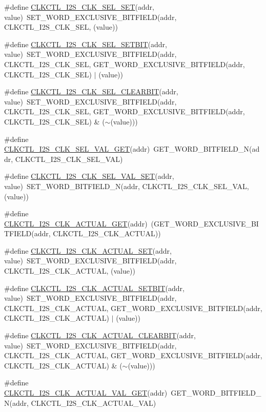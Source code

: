 \begin{DoxyCompactItemize}
\item 
\#define \hyperlink{a00544_af7e823dbf1f0ddaf887c9939338db930}{CLKCTL\_\-I2S\_\-CLK\_\-SEL\_\-SET}(addr, value)~SET\_\-WORD\_\-EXCLUSIVE\_\-BITFIELD(addr, CLKCTL\_\-I2S\_\-CLK\_\-SEL, (value))
\item 
\#define \hyperlink{a00544_a67f9083bc8d6b03da063e4d0124b066d}{CLKCTL\_\-I2S\_\-CLK\_\-SEL\_\-SETBIT}(addr, value)~SET\_\-WORD\_\-EXCLUSIVE\_\-BITFIELD(addr, CLKCTL\_\-I2S\_\-CLK\_\-SEL, GET\_\-WORD\_\-EXCLUSIVE\_\-BITFIELD(addr, CLKCTL\_\-I2S\_\-CLK\_\-SEL) $|$ (value))
\item 
\#define \hyperlink{a00544_a7d988737241ac1ecba2f6bece69cee81}{CLKCTL\_\-I2S\_\-CLK\_\-SEL\_\-CLEARBIT}(addr, value)~SET\_\-WORD\_\-EXCLUSIVE\_\-BITFIELD(addr, CLKCTL\_\-I2S\_\-CLK\_\-SEL, GET\_\-WORD\_\-EXCLUSIVE\_\-BITFIELD(addr, CLKCTL\_\-I2S\_\-CLK\_\-SEL) \& ($\sim$(value)))
\item 
\#define \hyperlink{a00544_ae7a05d4f32df6c568c12038ef168dc6e}{CLKCTL\_\-I2S\_\-CLK\_\-SEL\_\-VAL\_\-GET}(addr)~GET\_\-WORD\_\-BITFIELD\_\-N(addr, CLKCTL\_\-I2S\_\-CLK\_\-SEL\_\-VAL)
\item 
\#define \hyperlink{a00544_ae20adeb2ceaa2fbd3d2cb1c24415b585}{CLKCTL\_\-I2S\_\-CLK\_\-SEL\_\-VAL\_\-SET}(addr, value)~SET\_\-WORD\_\-BITFIELD\_\-N(addr, CLKCTL\_\-I2S\_\-CLK\_\-SEL\_\-VAL, (value))
\item 
\#define \hyperlink{a00544_a996b7a209755f41b8c8e23095d095f7a}{CLKCTL\_\-I2S\_\-CLK\_\-ACTUAL\_\-GET}(addr)~(GET\_\-WORD\_\-EXCLUSIVE\_\-BITFIELD(addr, CLKCTL\_\-I2S\_\-CLK\_\-ACTUAL))
\item 
\#define \hyperlink{a00544_ae5073d2a167d7bfd3844c2087e2aa89c}{CLKCTL\_\-I2S\_\-CLK\_\-ACTUAL\_\-SET}(addr, value)~SET\_\-WORD\_\-EXCLUSIVE\_\-BITFIELD(addr, CLKCTL\_\-I2S\_\-CLK\_\-ACTUAL, (value))
\item 
\#define \hyperlink{a00544_a262dc626d53eb7e7183510cd1c7d1113}{CLKCTL\_\-I2S\_\-CLK\_\-ACTUAL\_\-SETBIT}(addr, value)~SET\_\-WORD\_\-EXCLUSIVE\_\-BITFIELD(addr, CLKCTL\_\-I2S\_\-CLK\_\-ACTUAL, GET\_\-WORD\_\-EXCLUSIVE\_\-BITFIELD(addr, CLKCTL\_\-I2S\_\-CLK\_\-ACTUAL) $|$ (value))
\item 
\#define \hyperlink{a00544_a8e7afd0d12e65bf987d541dad6699b82}{CLKCTL\_\-I2S\_\-CLK\_\-ACTUAL\_\-CLEARBIT}(addr, value)~SET\_\-WORD\_\-EXCLUSIVE\_\-BITFIELD(addr, CLKCTL\_\-I2S\_\-CLK\_\-ACTUAL, GET\_\-WORD\_\-EXCLUSIVE\_\-BITFIELD(addr, CLKCTL\_\-I2S\_\-CLK\_\-ACTUAL) \& ($\sim$(value)))
\item 
\#define \hyperlink{a00544_ac7a9ba7350208431334135dce63a1389}{CLKCTL\_\-I2S\_\-CLK\_\-ACTUAL\_\-VAL\_\-GET}(addr)~GET\_\-WORD\_\-BITFIELD\_\-N(addr, CLKCTL\_\-I2S\_\-CLK\_\-ACTUAL\_\-VAL)

\end{DoxyCompactItemize}
